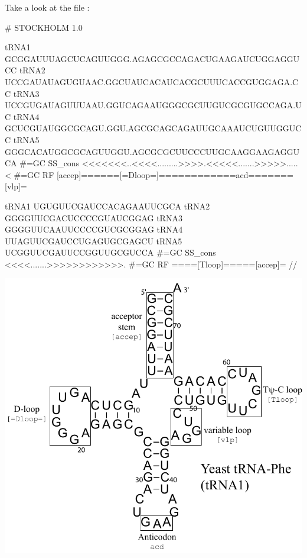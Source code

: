 Take a look at the file :

\vspace{1em}
\begin{minipage}{4.7in}
\begin{sreoutput}[xleftmargin=0em]
# STOCKHOLM 1.0

tRNA1             GCGGAUUUAGCUCAGUUGGG.AGAGCGCCAGACUGAAGAUCUGGAGGUCC
tRNA2             UCCGAUAUAGUGUAAC.GGCUAUCACAUCACGCUUUCACCGUGGAGA.CC
tRNA3             UCCGUGAUAGUUUAAU.GGUCAGAAUGGGCGCUUGUCGCGUGCCAGA.UC
tRNA4             GCUCGUAUGGCGCAGU.GGU.AGCGCAGCAGAUUGCAAAUCUGUUGGUCC
tRNA5             GGGCACAUGGCGCAGUUGGU.AGCGCGCUUCCCUUGCAAGGAAGAGGUCA
#=GC SS_cons      <<<<<<<..<<<<.........>>>>.<<<<<.......>>>>>.....<
#=GC RF           [accep]======[=Dloop=]============acd=======[vlp]=

tRNA1             UGUGUUCGAUCCACAGAAUUCGCA
tRNA2             GGGGUUCGACUCCCCGUAUCGGAG
tRNA3             GGGGUUCAAUUCCCCGUCGCGGAG
tRNA4             UUAGUUCGAUCCUGAGUGCGAGCU
tRNA5             UCGGUUCGAUUCCGGUUGCGUCCA
#=GC SS_cons      <<<<.......>>>>>>>>>>>>.
#=GC RF           ====[Tloop]=====[accep]=
//
\end{sreoutput}
\end{minipage}
\begin{minipage}{1.5in}
\includegraphics[scale=0.4]{Figures/trna1-DF6280-hand}
\end{minipage}
\vspace{1em}


